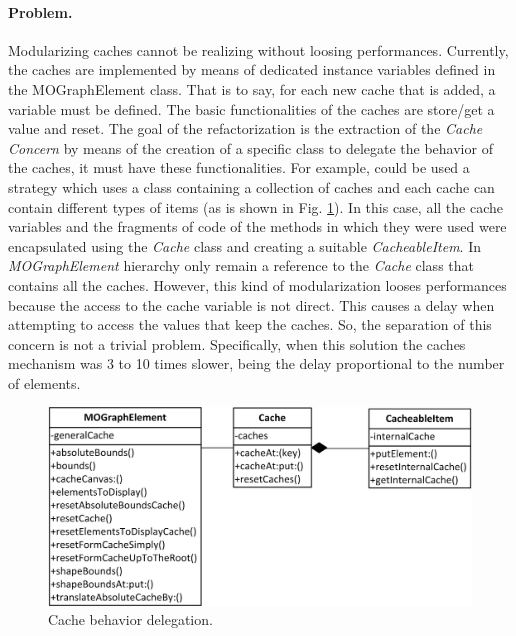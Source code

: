 \documentclass[runningheads]{llncs}
\begin{document}
\paragraph{Problem.}

Modularizing caches cannot be realizing without loosing performances.
Currently, the caches are implemented by means of dedicated instance variables
 defined in the MOGraphElement class. That is to say, for each
new cache that is added, a variable must be defined. The basic functionalities
of the caches are store/get a value and reset. The goal of
the refactorization is the extraction of the \emph{Cache Concern}
by means of the creation of a specific class to delegate the behavior
of the caches, it must have these functionalities. For example, could
be used a strategy which uses a class containing a collection of caches
and each cache can contain different types of items (as is shown in
Fig. \ref{fig:Cache-behaviour-delegation.}). In this case, all the
cache variables and the fragments of code of the methods in which
they were used were encapsulated using the \emph{Cache} class and
creating a suitable \emph{CacheableItem}. In \emph{MOGraphElement}
hierarchy only remain a reference to the \emph{Cache} class that contains
all the caches. However, this kind of modularization looses performances
because the access to the cache variable is not direct. This causes
a delay when attempting to access the values that keep the caches.
So, the separation of this concern is not a trivial problem. Specifically,
when this solution the caches mechanism was 3 to 10 times slower,
being the delay proportional to the number of elements.

%
\begin{figure}
\begin{centering}
\includegraphics[bb=27bp 615bp 338bp 762bp,scale=0.97]{CacheMechanisms} 
\par\end{centering}

\caption{Cache behavior delegation.\label{fig:Cache-behaviour-delegation.}}

\end{figure}
\end{document}
